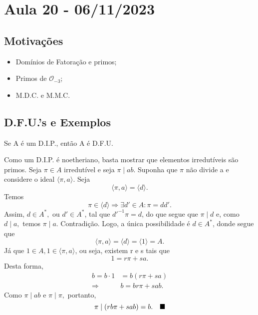 \documentclass[AlgebraII/algebraII_notes.tex]{subfiles}
\begin{document}
\section{Aula 20 - 06/11/2023}
\subsection{Motivações}
\begin{itemize}
	\item Domínios de Fatoração e primos;
	\item Primos de \(\mathcal{O}_{-3}\);
	\item M.D.C. e M.M.C.
\end{itemize}
\subsection{D.F.U.'s e Exemplos}
\begin{theorem*}
	Se A é um D.I.P., então A é D.F.U.
\end{theorem*}
\begin{proof*}
	Como um D.I.P. é noetheriano, basta mostrar que elementos irredutíveis são primos.
	Seja \(\pi \in A\) irredutível e seja \(\pi \mid ab.\) Suponha que \(\pi\) não divide a e considere
	o ideal \(\langle \pi , a \rangle.\) Seja
	\[
		\langle \pi , a \rangle = \langle d \rangle.
	\]
	Temos
	\[
		\pi \in \langle d \rangle \Rightarrow \exists d'\in A: \pi  = dd'.
	\]
	Assim, \(d\in A^{*},\) ou \(d'\in A^{*}\), tal que \(d'^{-1}\pi  = d\), do que segue que \(\pi \mid d\) e,
	como \(d\mid a,\) temos \(\pi \mid a.\) Contradição. Logo, a única possibilidade é \(d\in A^{*}\), donde segue que
	\[
		\langle \pi , a \rangle = \langle d \rangle = \langle 1 \rangle = A.
	\]
	Já que \(1\in A, 1\in \langle \pi , a \rangle\), ou seja, existem r e s tais que
	\[
		1 = r\pi +sa.
	\]
	Desta forma,
	\begin{align*}
		b = b \cdot 1 & = b(r\pi + sa)   \\
		\Rightarrow   & b = br\pi + sab.
	\end{align*}
	Como \(\pi \mid ab\) e \(\pi \mid \pi ,\) portanto,
	\[
		\pi \mid(rb\pi +sab) = b.\quad \text{$\blacksquare$}
	\]
\end{proof*}
\end{document}

